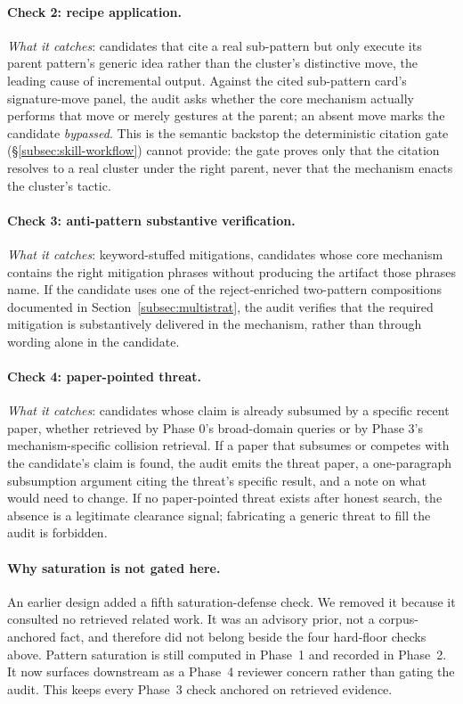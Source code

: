 \documentclass[10pt,a4paper]{article}
\begin{document}
\paragraph{Check 2: recipe application.} \emph{What it catches}: candidates that cite a real sub-pattern but only execute its parent pattern's generic idea rather than the cluster's distinctive move, the leading cause of incremental output. Against the cited sub-pattern card's signature-move panel, the audit asks whether the core mechanism actually performs that move or merely gestures at the parent; an absent move marks the candidate \emph{bypassed}. This is the semantic backstop the deterministic citation gate (\S\ref{subsec:skill-workflow}) cannot provide: the gate proves only that the citation resolves to a real cluster under the right parent, never that the mechanism enacts the cluster's tactic.

\paragraph{Check 3: anti-pattern substantive verification.} \emph{What it catches}: keyword-stuffed mitigations, candidates whose core mechanism contains the right mitigation phrases without producing the artifact those phrases name. If the candidate uses one of the reject-enriched two-pattern compositions documented in Section~\ref{subsec:multistrat}, the audit verifies that the required mitigation is substantively delivered in the mechanism, rather than through wording alone in the candidate.

\paragraph{Check 4: paper-pointed threat.} \emph{What it catches}: candidates whose claim is already subsumed by a specific recent paper, whether retrieved by Phase 0's broad-domain queries or by Phase 3's mechanism-specific collision retrieval. If a paper that subsumes or competes with the candidate's claim is found, the audit emits the threat paper, a one-paragraph subsumption argument citing the threat's specific result, and a note on what would need to change. If no paper-pointed threat exists after honest search, the absence is a legitimate clearance signal; fabricating a generic threat to fill the audit is forbidden.

\paragraph{Why saturation is not gated here.} An earlier design added a fifth saturation-defense check. We removed it because it consulted no retrieved related work. It was an advisory prior, not a corpus-anchored fact, and therefore did not belong beside the four hard-floor checks above. Pattern saturation is still computed in Phase~1 and recorded in Phase~2. It now surfaces downstream as a Phase~4 reviewer concern rather than gating the audit. This keeps every Phase~3 check anchored on retrieved evidence.
\end{document}
